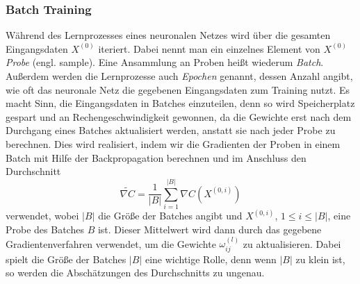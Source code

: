 \subsubsection{Batch Training}
Während des Lernprozesses eines neuronalen Netzes wird über die gesamten Eingangsdaten $X^{(0)}$ iteriert. Dabei nennt
man ein einzelnes Element von $X^{(0)}$ \textit{Probe} (engl. sample). Eine Ansammlung an Proben heißt wiederum
\textit{Batch}. Außerdem werden die Lernprozesse auch \textit{Epochen} genannt, dessen Anzahl angibt, wie oft das
neuronale Netz die gegebenen Eingangsdaten zum Training nutzt. Es macht Sinn, die Eingangsdaten in Batches einzuteilen,
denn so wird Speicherplatz gespart und an Rechengeschwindigkeit gewonnen, da die Gewichte erst nach dem Durchgang eines
Batches aktualisiert werden, anstatt sie nach jeder Probe zu berechnen. Dies wird realisiert, indem wir die Gradienten
der Proben in einem Batch mit Hilfe der Backpropagation berechnen und im Anschluss den Durchschnitt
\[
    \widetilde{\nabla C} = \frac{1}{|B|} \sum_{i=1}^{|B|} \nabla C(X^{(0,i)})
\]
verwendet, wobei $|B|$ die Größe der Batches angibt und $X^{(0,i)}$, $1 \leq i \leq |B|$, eine Probe des Batches $B$ ist.
Dieser Mittelwert wird dann durch das gegebene Gradientenverfahren verwendet, um die Gewichte $\omega_{ij}^{(l)}$ zu
aktualisieren. Dabei spielt die Größe der Batches $|B|$ eine wichtige Rolle, denn wenn $|B|$ zu klein ist, so werden die
Abschätzungen des Durchschnitts zu ungenau.

